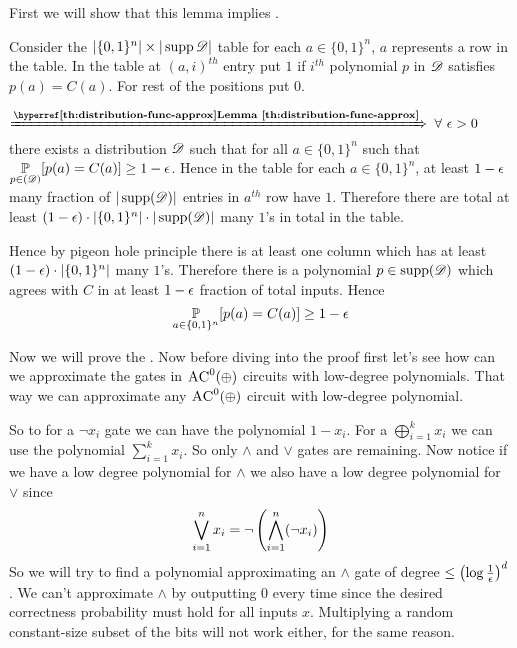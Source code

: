First we will show that this lemma implies . \vspace*{2mm}

\begin{proof-of-lemma}
	Consider the $|\{0,1\}^n|\times |\operatorname{supp}{\mathscr{D}}|$ table for each $a\in\{0,1\}^n$, $a$ represents a row in the table. In the table at $(a,i)^{th}$ entry put $1$ if $i^{th}$ polynomial $p$ in ${\mathscr{D}}$ satisfies $p(a)=C(a)$. For rest of the positions put $0$. \parinf\vspace*{2mm}
	
	$\xRightarrow{\textbf{\lmref{distribution-func-approx}}}$ $\forall\ \epsilon>0$ there exists a distribution ${\mathscr{D}}$ such that for all $a\in\{0,1\}^n$ such that $\underset{p\in({\mathscr{D}})}{\mathbb{P}}[p(a)=C(a)]\geq 1-\epsilon$. Hence in the table for each $a\in\{0,1\}^n$, at least $1-\epsilon$ many fraction of $|\operatorname{supp}({\mathscr{D}})|$ entries in $a^{th}$ row have $1$. Therefore there are total at least $(1-\epsilon)\cdot |\{0,1\}^n|\cdot |\operatorname{supp}({\mathscr{D}})|$ many $1$'s in total in the table. \parinn
	
	Hence by pigeon hole principle there is at least one column which has at least $(1-\epsilon)\cdot |\{0,1\}^n|$ many $1$'s. Therefore there is a polynomial $p\in\operatorname{supp}({\mathscr{D}})$ which agrees with $C$ in at least $1-\epsilon$  fraction of total inputs. Hence $${\underset{a\in\{0,1\}^n}{\mathbb{P}}[p(a)=C(a)]\geq 1-\epsilon}$$
\end{proof-of-lemma}

Now we will prove the . Now before diving into the proof first let's see how can we approximate the gates in $\textsc{AC}^0(\oplus)$ circuits with low-degree polynomials. That way we can approximate any $\textsc{AC}^0(\oplus)$ circuit with low-degree polynomial.

So to for a $\neg x_i$ gate we can have the polynomial $1-x_i$. For a $\bigoplus\limits_{i=1}^k x_i$ we can use the polynomial $\sum\limits_{i=1}^k x_i$. So only $\wedge$ and $\vee$ gates are remaining. Now notice if we have a low degree polynomial for $\wedge $ we also have a low degree polynomial for $\vee$ since $$\bigvee_{i=1}^n x_i=\neg \left( \bigwedge\limits_{i=1}^n (\neg x_i) \right)$$So we will try to find a polynomial approximating  an $\wedge$ gate of degree $\leq \left(\log\frac1{\epsilon}  \right)^d$.  We can't approximate $\wedge$ by outputting $0$ every time since the desired correctness probability must hold for all inputs $x$. Multiplying a random constant-size subset of the bits will not work either, for the same reason. 


